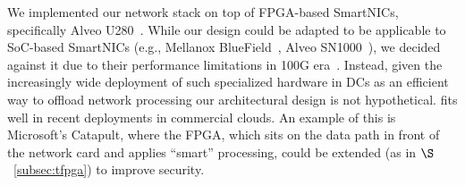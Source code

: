 We implemented our network stack on top of FPGA-based SmartNICs, specifically Alveo U280~\cite{alveo_smartnics}. While our design could be adapted to be applicable to  SoC-based SmartNICs (e.g., Mellanox BlueField~\cite{bluefield_smartnics}, Alveo SN1000~\cite{alveo_sn1000}), we decided against it due to their performance limitations in 100G era~\cite{211249}. Instead, given the increasingly wide deployment of such specialized hardware in DCs as an efficient way to offload network processing our architectural design is not hypothetical. \projecttitle{} fits well in recent deployments in commercial clouds. An example of this is Microsoft’s Catapult, where the FPGA, which sits on the data path in front of the network card and applies ``smart'' processing, could be extended (as in $\S$~\ref{subsec:tfpga}) to improve security.






